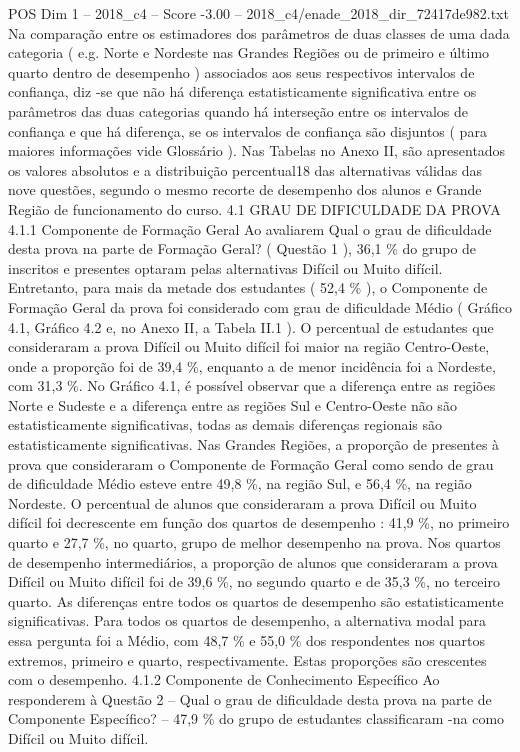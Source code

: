 \begin{textsample}{POS Dim 1 – 2018\_c4 – Score -3.00 – 2018\_c4/enade\_2018\_dir\_72417de982.txt}
Na comparação entre os estimadores dos parâmetros de duas classes de uma dada categoria ( e.g.
Norte e Nordeste nas Grandes Regiões ou de primeiro e último quarto dentro de desempenho ) associados aos seus respectivos intervalos de confiança, diz -se que não há diferença estatisticamente significativa entre os parâmetros das duas categorias quando há interseção entre os intervalos de confiança e que há diferença, se os intervalos de confiança são disjuntos ( para maiores informações vide Glossário ).
Nas Tabelas no Anexo II, são apresentados os valores absolutos e a distribuição percentual18 das alternativas válidas das nove questões, segundo o mesmo recorte de desempenho dos alunos e Grande Região de funcionamento do curso. 4.1 GRAU DE DIFICULDADE DA PROVA 4.1.1 Componente de Formação Geral Ao avaliarem Qual o grau de dificuldade desta prova na parte de Formação Geral? ( Questão 1 ), 36,1 \% do grupo de inscritos e presentes optaram pelas alternativas Difícil ou Muito difícil.
Entretanto, para mais da metade dos estudantes ( 52,4 \% ), o Componente de Formação Geral da prova foi considerado com grau de dificuldade Médio ( Gráfico 4.1, Gráfico 4.2 e, no Anexo II, a Tabela II.1 ).
O percentual de estudantes que consideraram a prova Difícil ou Muito difícil foi maior na região Centro-Oeste, onde a proporção foi de 39,4 \%, enquanto a de menor incidência foi a Nordeste, com 31,3 \%.
No Gráfico 4.1, é possível observar que a diferença entre as regiões Norte e Sudeste e a diferença entre as regiões Sul e Centro-Oeste não são estatisticamente significativas, todas as demais diferenças regionais são estatisticamente significativas.
Nas Grandes Regiões, a proporção de presentes à prova que consideraram o Componente de Formação Geral como sendo de grau de dificuldade Médio esteve entre 49,8 \%, na região Sul, e 56,4 \%, na região Nordeste.
O percentual de alunos que consideraram a prova Difícil ou Muito difícil foi decrescente em função dos quartos de desempenho : 41,9 \%, no primeiro quarto e 27,7 \%, no quarto, grupo de melhor desempenho na prova.
Nos quartos de desempenho intermediários, a proporção de alunos que consideraram a prova Difícil ou Muito difícil foi de 39,6 \%, no segundo quarto e de 35,3 \%, no terceiro quarto.
As diferenças entre todos os quartos de desempenho são estatisticamente significativas.
Para todos os quartos de desempenho, a alternativa modal para essa pergunta foi a Médio, com 48,7 \% e 55,0 \% dos respondentes nos quartos extremos, primeiro e quarto, respectivamente.
Estas proporções são crescentes com o desempenho. 4.1.2 Componente de Conhecimento Específico Ao responderem à Questão 2 – Qual o grau de dificuldade desta prova na parte de Componente Específico? – 47,9 \% do grupo de estudantes classificaram -na como Difícil ou Muito difícil.

\end{textsample}
